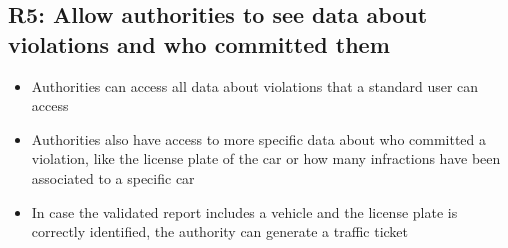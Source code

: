 \subsection{R5: Allow authorities to see data about violations and who committed them}
\begin{itemize}
    \item Authorities can access all data about violations that a standard user can access
    \item Authorities also have access to more specific data about who committed a violation, like the license plate of the car or how many infractions have been associated to a specific car
    \item In case the validated report includes a vehicle and the license plate is correctly identified, the authority can generate a traffic ticket
\end{itemize}
